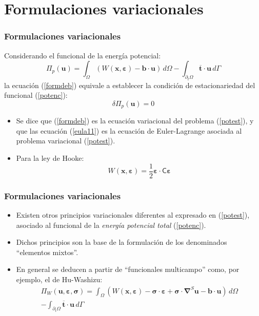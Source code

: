 \documentclass[handout]{beamer}
\begin{document}
\section{Formulaciones variacionales}
\begin{frame}
\frametitle{Formulaciones variacionales}
Considerando el funcional de la energía potencial:
\begin{equation}
\Pi_p(\bm{u})=
\int_{\Omega} \left(
W(\bm{x},\bm{\varepsilon})-\bm{b} \cdot \bm{u}\right) \, d \Omega
-\int_{\partial_t \Omega} \overline{\bm{t}}\cdot\bm{u} \, d \Gamma\label{potenc}
\end{equation}
la ecuación (\ref{formdeb}) equivale a establecer la condición de
estacionariedad del funcional (\ref{potenc}):
\begin{equation}
\delta \Pi_p(\bm{u})=0 \label{potest}
\end{equation}
\begin{itemize}
\item Se dice que (\ref{formdeb}) es la ecuación variacional del problema
(\ref{potest}), y que las ecuación (\ref{eula11}) es la ecuación de
Euler-Lagrange asociada al problema variacional (\ref{potest}).
\item Para la ley de Hooke:
\begin{equation}
W(\bm{x},\bm{\varepsilon})=\frac{1}{2} \bm{\varepsilon} \cdot 
\bm{\mathsf{C}} \bm{\varepsilon}
\end{equation}
\end{itemize}
\end{frame}
\begin{frame}
\frametitle{Formulaciones variacionales}
\begin{itemize}
\item Existen otros principios variacionales diferentes al expresado en
(\ref{potest}), asociado al funcional de la {\em energía potencial
total} (\ref{potenc}).
\item Dichos principios son la base de la formulación de
los denominados ``elementos mixtos''.
\item En general se deducen a partir de ``funcionales multicampo'' como,
por ejemplo, el de Hu-Washizu:
\begin{multline*}
\Pi_W(\bm{u},\bm{\varepsilon},\bm{\sigma})=
\int_{\Omega} \left(
W(\bm{x},\bm{\varepsilon})-\bm{\sigma}\cdot\bm{\varepsilon}+
\bm{\sigma}\cdot\bm{\nabla}^{S}\bm{u}-\bm{b} \cdot \bm{u}\right) \, d \Omega \\
-\int_{\partial_t \Omega} \overline{\bm{t}}\cdot\bm{u} \, d \Gamma\label{hu-was}
\end{multline*}
\end{itemize}
\end{frame}
\end{document}
